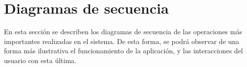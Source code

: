 \section{Diagramas de secuencia}

En esta sección se describen los diagramas de secuencia de las operaciones más importantes realizadas en el sistema. De esta forma, se podrá observar de una forma más ilustrativa el funcionamiento de la aplicación, y las interacciones del usuario con esta última.